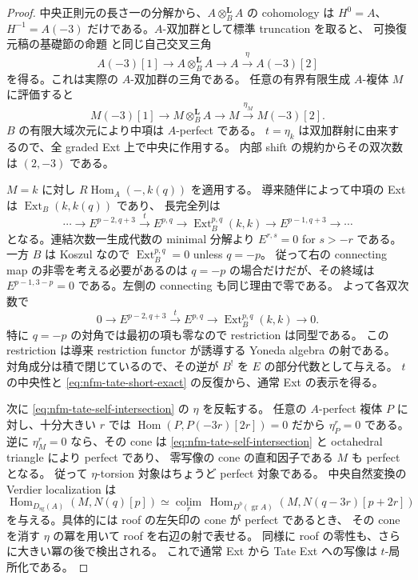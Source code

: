 \begin{proof}
中央正則元の長さ一の分解から、$A\otimes_B^{\mathbf L}A$ の cohomology は
$H^0=A$、$H^{-1}=A(-3)$ だけである。$A$-双加群として標準 truncation を取ると、
可換復元稿の基礎節の命題
と同じ自己交叉三角
\[
 A(-3)[1]\longrightarrow A\otimes_B^{\mathbf L}A
 \longrightarrow A\xrightarrow{\eta}A(-3)[2]
\]
を得る。これは実際の $A$-双加群の三角である。
任意の有界有限生成 $A$-複体 $M$ に評価すると
\begin{equation}\label{eq:nfm-tate-self-intersection}
M(-3)[1]\longrightarrow M\otimes_B^{\mathbf L}A
 \longrightarrow M\xrightarrow{\eta_M}M(-3)[2].
\end{equation}
$B$ の有限大域次元により中項は $A$-perfect である。
$t=\eta_k$ は双加群射に由来するので、全 graded Ext 上で中央に作用する。
内部 shift の規約からその双次数は $(2,-3)$ である。

$M=k$ に対し $R\operatorname{Hom}_A(-,k(q))$ を適用する。
導来随伴によって中項の Ext は $\operatorname{Ext}_B(k,k(q))$ であり、
長完全列は
\begin{equation}\label{eq:nfm-tate-change-rings}
\cdots\longrightarrow E^{p-2,q+3}\xrightarrow{t}E^{p,q}
 \longrightarrow\operatorname{Ext}_B^{p,q}(k,k)
 \longrightarrow E^{p-1,q+3}\longrightarrow\cdots
\end{equation}
となる。連結次数一生成代数の minimal 分解より
$E^{r,s}=0$ for $s>-r$ である。
一方 $B$ は Koszul なので $\operatorname{Ext}_B^{p,q}=0$ unless $q=-p$。
従って右の connecting map の非零を考える必要があるのは
$q=-p$ の場合だけだが、その終域は
$E^{p-1,3-p}=0$ である。左側の connecting も同じ理由で零である。
よって各双次数で
\begin{equation}\label{eq:nfm-tate-short-exact}
0\longrightarrow E^{p-2,q+3}\xrightarrow{t}E^{p,q}
 \longrightarrow\operatorname{Ext}_B^{p,q}(k,k)\longrightarrow0.
\end{equation}
特に $q=-p$ の対角では最初の項も零なので restriction は同型である。
この restriction は導来 restriction functor が誘導する Yoneda algebra の射である。
対角成分は積で閉じているので、その逆が $B^!$ を $E$ の部分代数として与える。
$t$ の中央性と \eqref{eq:nfm-tate-short-exact} の反復から、通常 Ext の表示を得る。

次に \eqref{eq:nfm-tate-self-intersection} の $\eta$ を反転する。
任意の $A$-perfect 複体 $P$ に対し、十分大きい $r$ では
$\operatorname{Hom}(P,P(-3r)[2r])=0$ だから $\eta_P^r=0$ である。
逆に $\eta_M^r=0$ なら、その cone は \eqref{eq:nfm-tate-self-intersection} と octahedral triangle により perfect であり、
零写像の cone の直和因子である $M$ も perfect となる。
従って $\eta$-torsion 対象はちょうど perfect 対象である。
中央自然変換の Verdier localization は
\begin{equation}\label{eq:nfm-tate-hom-localization}
\operatorname{Hom}_{D_{\mathrm{sg}}(A)}(M,N(q)[p])
 \simeq\underset{r}{\operatorname{colim}}\,
 \operatorname{Hom}_{D^b(\operatorname{gr}A)}
       (M,N(q-3r)[p+2r])
\end{equation}
を与える。具体的には roof の左矢印の cone が perfect であるとき、
その cone を消す $\eta$ の冪を用いて roof を右辺の射で表せる。
同様に roof の零性も、さらに大きい冪の後で検出される。
これで通常 Ext から Tate Ext への写像は $t$-局所化である。


\end{proof}
